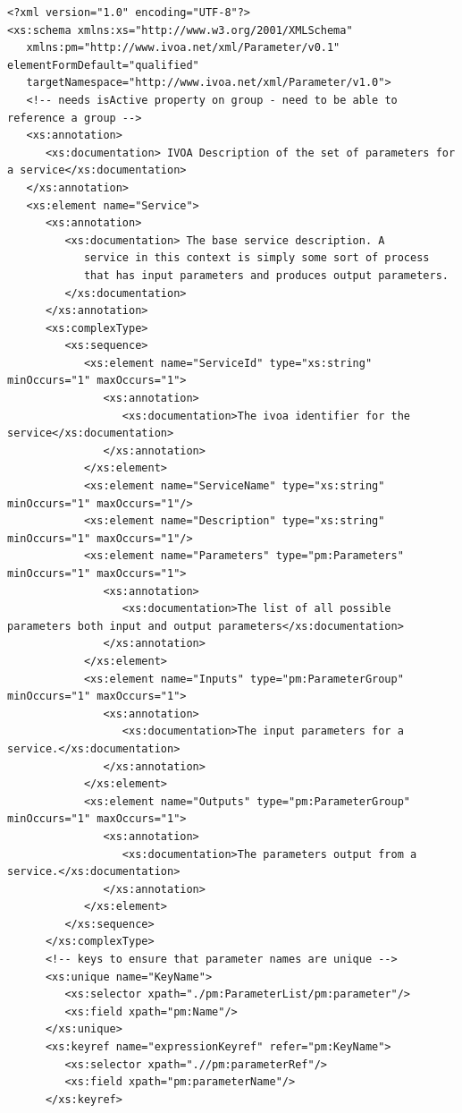 \documentclass[a4paper,11pt] {ivoa}
\begin{document}
\begin{lstlisting}[style=listXML]
<?xml version="1.0" encoding="UTF-8"?>
<xs:schema xmlns:xs="http://www.w3.org/2001/XMLSchema"
   xmlns:pm="http://www.ivoa.net/xml/Parameter/v0.1" elementFormDefault="qualified"
   targetNamespace="http://www.ivoa.net/xml/Parameter/v1.0">
   <!-- needs isActive property on group - need to be able to reference a group -->
   <xs:annotation>
      <xs:documentation> IVOA Description of the set of parameters for a service</xs:documentation>
   </xs:annotation>
   <xs:element name="Service">
      <xs:annotation>
         <xs:documentation> The base service description. A
            service in this context is simply some sort of process
            that has input parameters and produces output parameters.
         </xs:documentation>
      </xs:annotation>
      <xs:complexType>
         <xs:sequence>
            <xs:element name="ServiceId" type="xs:string" minOccurs="1" maxOccurs="1">
               <xs:annotation>
                  <xs:documentation>The ivoa identifier for the service</xs:documentation>
               </xs:annotation>
            </xs:element>
            <xs:element name="ServiceName" type="xs:string" minOccurs="1" maxOccurs="1"/>
            <xs:element name="Description" type="xs:string" minOccurs="1" maxOccurs="1"/>
            <xs:element name="Parameters" type="pm:Parameters" minOccurs="1" maxOccurs="1">
               <xs:annotation>
                  <xs:documentation>The list of all possible parameters both input and output parameters</xs:documentation>
               </xs:annotation>
            </xs:element>
            <xs:element name="Inputs" type="pm:ParameterGroup" minOccurs="1" maxOccurs="1">
               <xs:annotation>
                  <xs:documentation>The input parameters for a service.</xs:documentation>
               </xs:annotation>
            </xs:element>
            <xs:element name="Outputs" type="pm:ParameterGroup" minOccurs="1" maxOccurs="1">
               <xs:annotation>
                  <xs:documentation>The parameters output from a service.</xs:documentation>
               </xs:annotation>
            </xs:element>
         </xs:sequence>
      </xs:complexType>
      <!-- keys to ensure that parameter names are unique -->
      <xs:unique name="KeyName">
         <xs:selector xpath="./pm:ParameterList/pm:parameter"/>
         <xs:field xpath="pm:Name"/>
      </xs:unique>
      <xs:keyref name="expressionKeyref" refer="pm:KeyName">
         <xs:selector xpath=".//pm:parameterRef"/>
         <xs:field xpath="pm:parameterName"/>
      </xs:keyref>


\end{lstlisting}
\end{document}
